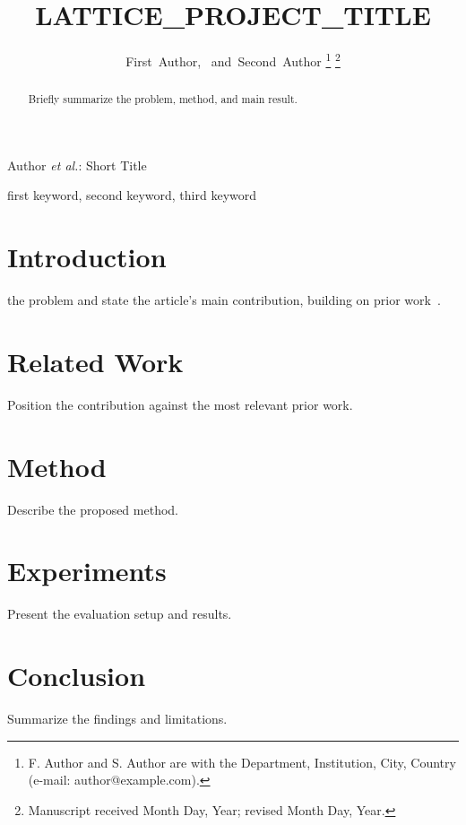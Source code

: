\documentclass[journal]{IEEEtran}
\begin{document}
\title{LATTICE_PROJECT_TITLE}

\author{First~Author,~
        and~Second~Author%
\thanks{F. Author and S. Author are with the Department, Institution,
City, Country (e-mail: author@example.com).}%
\thanks{Manuscript received Month Day, Year; revised Month Day, Year.}}

%
{Author \MakeLowercase{\textit{et al.}}: Short Title}

\maketitle

\begin{abstract}
Briefly summarize the problem, method, and main result.
\end{abstract}

\begin{IEEEkeywords}
first keyword, second keyword, third keyword
\end{IEEEkeywords}

\section{Introduction}
 the problem and state the article's main
contribution, building on prior work~\cite{shell2015ieeetran,kopka2004guide}.

\section{Related Work}
Position the contribution against the most relevant prior work.

\section{Method}
Describe the proposed method.

\section{Experiments}
Present the evaluation setup and results.

\section{Conclusion}
Summarize the findings and limitations.



\end{document}
